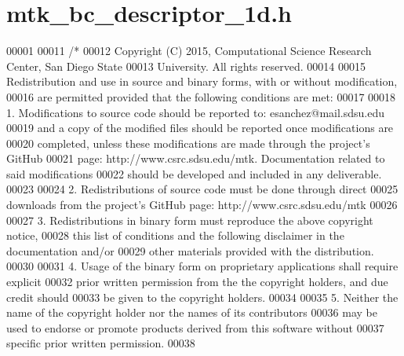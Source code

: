\hypertarget{mtk__bc__descriptor__1d_8h_source}{\section{mtk\+\_\+bc\+\_\+descriptor\+\_\+1d.\+h}
\label{mtk__bc__descriptor__1d_8h_source}
}

\begin{DoxyCode}
00001 
00011 \textcolor{comment}{/*}
00012 \textcolor{comment}{Copyright (C) 2015, Computational Science Research Center, San Diego State}
00013 \textcolor{comment}{University. All rights reserved.}
00014 \textcolor{comment}{}
00015 \textcolor{comment}{Redistribution and use in source and binary forms, with or without modification,}
00016 \textcolor{comment}{are permitted provided that the following conditions are met:}
00017 \textcolor{comment}{}
00018 \textcolor{comment}{1. Modifications to source code should be reported to: esanchez@mail.sdsu.edu}
00019 \textcolor{comment}{and a copy of the modified files should be reported once modifications are}
00020 \textcolor{comment}{completed, unless these modifications are made through the project's GitHub}
00021 \textcolor{comment}{page: http://www.csrc.sdsu.edu/mtk. Documentation related to said modifications}
00022 \textcolor{comment}{should be developed and included in any deliverable.}
00023 \textcolor{comment}{}
00024 \textcolor{comment}{2. Redistributions of source code must be done through direct}
00025 \textcolor{comment}{downloads from the project's GitHub page: http://www.csrc.sdsu.edu/mtk}
00026 \textcolor{comment}{}
00027 \textcolor{comment}{3. Redistributions in binary form must reproduce the above copyright notice,}
00028 \textcolor{comment}{this list of conditions and the following disclaimer in the documentation and/or}
00029 \textcolor{comment}{other materials provided with the distribution.}
00030 \textcolor{comment}{}
00031 \textcolor{comment}{4. Usage of the binary form on proprietary applications shall require explicit}
00032 \textcolor{comment}{prior written permission from the the copyright holders, and due credit should}
00033 \textcolor{comment}{be given to the copyright holders.}
00034 \textcolor{comment}{}
00035 \textcolor{comment}{5. Neither the name of the copyright holder nor the names of its contributors}
00036 \textcolor{comment}{may be used to endorse or promote products derived from this software without}
00037 \textcolor{comment}{specific prior written permission.}
00038 \textcolor{comment}{}

\end{DoxyCode}
